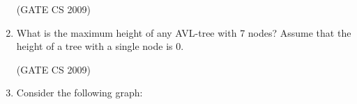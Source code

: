 \documentclass[a4paper, 11pt]{article}
\begin{document}
\begin{enumerate}
\begin{enumerate}
    \end{enumerate}

    \hfill (GATE CS 2009)

    \item What is the maximum height of any AVL-tree with 7 nodes? Assume that the height of a tree with a single node is 0.
    \begin{enumerate}
    \end{enumerate}


    \hfill (GATE CS 2009)

    \item Consider the following graph:


\end{enumerate}
\end{document}
